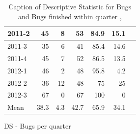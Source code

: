 \documentclass[UKenglish]{ifimaster}  %
\begin{document}
\begin{appendices}
\begin{table}[!htbp]
\begin{adjustwidth}{-2.5cm}{}
\begin{subfigure}[b]{0.4\textwidth}
{\begin{tabular}{ | l | r | r | r | r | r | r | }
	2011-2 & 45 & 8 & 53 & 84.9 & 15.1 \\ \hline
	2011-3 & 35 & 6 & 41 & 85.4 & 14.6 \\ \hline
	2011-4 & 45 & 7 & 52 & 86.5 & 13.5 \\ \hline
	2012-1 & 46 & 2 & 48 & 95.8 & 4.2 \\ \hline
	2012-2 & 36 & 12 & 48 & 75 & 25 \\ \hline
	2012-3 & 67 & 0 & 67 & 100 & 0 \\ \hline
	Mean & 38.3 & 4.3 & 42.7 & 65.9 & 34.1  \\ \hline
\end{tabular}
}
\caption{DS - Bugs per quarter}
 \label{DS:FTPQ:7}
\end{subfigure}
\end{adjustwidth}
\caption[Optional caption for list of figures]{Caption of Descriptive Statistic for Bugs and Bugs finished within quarter  , }
\label{DS:7:5} %
\end{table}


\end{appendices}
\end{document}
